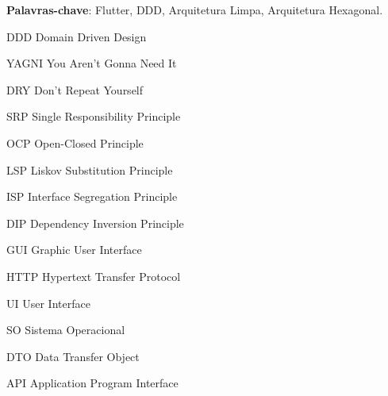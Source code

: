 \documentclass[12pt, %
openright, 
oneside, %
a4paper,    %
brazil]{facom-ufu-abntex2}
\begin{document}





\begin{resumo} %


    \vspace{\onelineskip}

    \noindent
    \textbf{Palavras-chave}: Flutter, DDD, Arquitetura Limpa, Arquitetura Hexagonal. %
\end{resumo}

\listoffigures*
\cleardoublepage




\begin{siglas} %
    \item[DDD] Domain Driven Design
    \item[YAGNI] You Aren't Gonna Need It
    \item[DRY] Don't Repeat Yourself
    \item[SRP] Single Responsibility Principle
    \item[OCP] Open-Closed Principle
    \item[LSP] Liskov Substitution Principle
    \item[ISP] Interface Segregation Principle
    \item[DIP] Dependency Inversion Principle
    \item[GUI] Graphic User Interface
    \item[HTTP] Hypertext Transfer Protocol
    \item[UI] User Interface
    \item[SO] Sistema Operacional
    \item[DTO] Data Transfer Object
    \item[API] Application Program Interface
\end{siglas}
\end{document}
